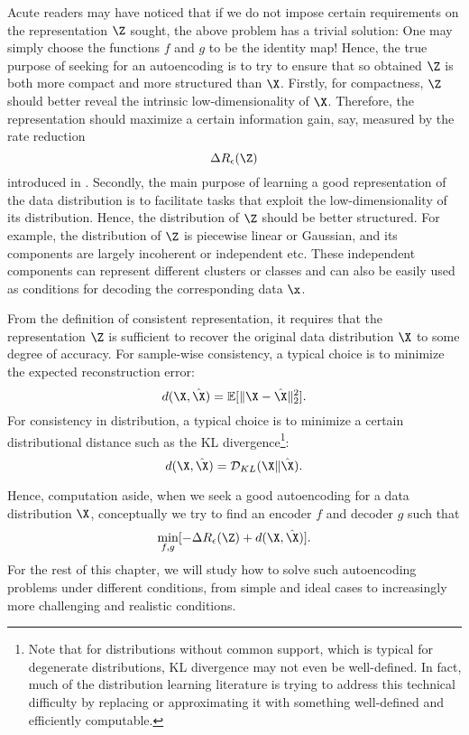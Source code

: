 \documentclass[../../book-main.tex]{subfiles}
\begin{document}
Acute readers may have noticed that if we do not impose certain
requirements on the representation $\Z$ sought, the above problem has
a trivial solution: One may simply choose the functions $f$ and $g$
to be the identity map! Hence, the true purpose of seeking for an
autoencoding is to try to ensure that so obtained $\Z$ is both more
compact and more structured than $\X$. Firstly, for compactness, $\Z$
should better reveal the intrinsic low-dimensionality of $\X$.
Therefore, the representation should maximize a certain information
gain, say, measured by the rate reduction
\begin{equation}
  \Delta R_{\epsilon}(\Z)
\end{equation}
introduced in . Secondly, the main purpose of
learning a good representation of the data distribution is to
facilitate tasks that exploit the low-dimensionality of its
distribution. Hence, the distribution of $\Z$ should be better
structured. For example, the distribution of $\Z$ is piecewise linear
or Gaussian, and its components are largely incoherent or independent
etc. These independent components can represent different clusters or
classes and can also be easily used as conditions for decoding the
corresponding data $\x$.

From the definition of consistent representation, it requires that
the representation $\Z$ is sufficient to recover the original data
distribution $\X$ to some degree of accuracy. For sample-wise
consistency, a typical choice is to minimize the expected reconstruction error:
\begin{equation}
  d(\X, \hat \X) = \mathbb{E}[\|\X - \hat\X\|_2^2].
\end{equation}
For consistency in distribution, a typical choice is to minimize a
certain distributional distance such as the KL
divergence\footnote{Note that for distributions without common
  support, which is typical for degenerate distributions, KL divergence
  may not even be well-defined. In fact, much of the distribution
  learning literature is trying to address this technical difficulty by
  replacing or approximating it with something well-defined and
efficiently computable.}:
\begin{equation}
  d(\X, \hat \X) = \mathcal{D}_{KL}(\X\|\hat\X).
\end{equation}

Hence, computation aside, when we seek a good autoencoding for a data
distribution $\X$,  conceptually we try to find an encoder $f$ and
decoder $g$ such that
\begin{equation}
  \min_{f, g} [- \Delta R_{\epsilon}(\Z) + d(\X, \hat \X)].
  \label{eqn:autoencode-objective-ch5}
\end{equation}
For the rest of this chapter, we will study how to solve such
autoencoding problems under different conditions, from simple and
ideal cases to increasingly more challenging and realistic conditions.
\end{document}

